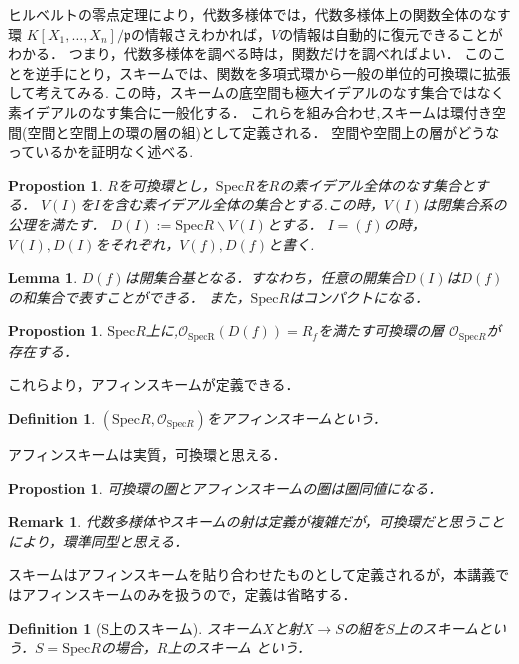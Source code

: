 \documentclass{ujarticle}
\newtheorem{dfn}[thm]{Definition}
\newtheorem{prop}[thm]{Propostion}
\newtheorem{lem}[thm]{Lemma}
\newtheorem*{rem}{Remark}
\begin{document}
ヒルベルトの零点定理により，代数多様体では，代数多様体上の関数全体のなす環
$K[X_1,\dots,X_n]/\mathfrak{p}$の情報さえわかれば，$V$の情報は自動的に復元できることがわかる．
つまり，代数多様体を調べる時は，関数だけを調べればよい．
このことを逆手にとり，スキームでは、関数を多項式環から一般の単位的可換環に拡張して考えてみる.
この時，スキームの底空間も極大イデアルのなす集合ではなく素イデアルのなす集合に一般化する．
これらを組み合わせ,スキームは環付き空間(空間と空間上の環の層の組)として定義される．
空間や空間上の層がどうなっているかを証明なく述べる.

\begin{prop}
$R$を可換環とし，$\mathrm{Spec}R$を$R$の素イデアル全体のなす集合とする．
$V(I)$を$I$を含む素イデアル全体の集合とする.この時，$V(I)$は閉集合系の公理を満たす．
$D(I):=\mathrm{Spec}R \backslash V(I)$とする．
$I=(f)$の時，$V(I),D(I)$をそれぞれ，$V(f),D(f)$と書く.
\end{prop}

\begin{lem}
 $D(f)$は開集合基となる．すなわち，任意の開集合$D(I)$は$D(f)$の和集合で表すことができる．
 また，$\mathrm{Spec}R$はコンパクトになる．
\end{lem}

\begin{prop}
 $\mathrm{Spec}R$上に,$\mathcal{O}_{\mathrm{SpecR}}(D(f))=R_f$を満たす可換環の層
 $\mathcal{O}_{\mathrm{Spec}R}$が存在する．
\end{prop}

これらより，アフィンスキームが定義できる．

\begin{dfn}
 $(\mathrm{Spec}R,\mathcal{O}_{\mathrm{Spec}R})$をアフィンスキームという．
\end{dfn}

アフィンスキームは実質，可換環と思える．

\begin{prop}
 可換環の圏とアフィンスキームの圏は圏同値になる．
\end{prop}
\begin{rem}
 代数多様体やスキームの射は定義が複雑だが，可換環だと思うことにより，環準同型と思える．
\end{rem}
スキームはアフィンスキームを貼り合わせたものとして定義されるが，本講義ではアフィンスキームのみを扱うので，定義は省略する．

\begin{dfn}[S上のスキーム]
  スキーム$X$と射$X \to S$の組を$S$上のスキームという．$S=\mathrm{Spec}R$の場合，$R$上のスキーム
  という．
\end{dfn}
\end{document}
